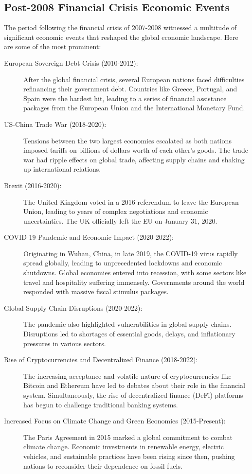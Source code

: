 \subsection*{Post-2008 Financial Crisis Economic Events}
The period following the financial crisis of 2007-2008 witnessed a multitude of significant economic events that reshaped the global economic landscape. Here are some of the most prominent:
\begin{description}
    \item[European Sovereign Debt Crisis (2010-2012):] After the global financial crisis, several European nations faced difficulties refinancing their government debt. Countries like Greece, Portugal, and Spain were the hardest hit, leading to a series of financial assistance packages from the European Union and the International Monetary Fund.
    \item[US-China Trade War (2018-2020):] Tensions between the two largest economies escalated as both nations imposed tariffs on billions of dollars worth of each other's goods. The trade war had ripple effects on global trade, affecting supply chains and shaking up international relations.
    \item[Brexit (2016-2020):] The United Kingdom voted in a 2016 referendum to leave the European Union, leading to years of complex negotiations and economic uncertainties. The UK officially left the EU on January 31, 2020.
    \item[COVID-19 Pandemic and Economic Impact (2020-2022):] Originating in Wuhan, China, in late 2019, the COVID-19 virus rapidly spread globally, leading to unprecedented lockdowns and economic shutdowns. Global economies entered into recession, with some sectors like travel and hospitality suffering immensely. Governments around the world responded with massive fiscal stimulus packages.
    \item[Global Supply Chain Disruptions (2020-2022):] The pandemic also highlighted vulnerabilities in global supply chains. Disruptions led to shortages of essential goods, delays, and inflationary pressures in various sectors.
    \item[Rise of Cryptocurrencies and Decentralized Finance (2018-2022):] The increasing acceptance and volatile nature of cryptocurrencies like Bitcoin and Ethereum have led to debates about their role in the financial system. Simultaneously, the rise of decentralized finance (DeFi) platforms has begun to challenge traditional banking systems.
    \item[Increased Focus on Climate Change and Green Economies (2015-Present):] The Paris Agreement in 2015 marked a global commitment to combat climate change. Economic investments in renewable energy, electric vehicles, and sustainable practices have been rising since then, pushing nations to reconsider their dependence on fossil fuels.

\end{description}
